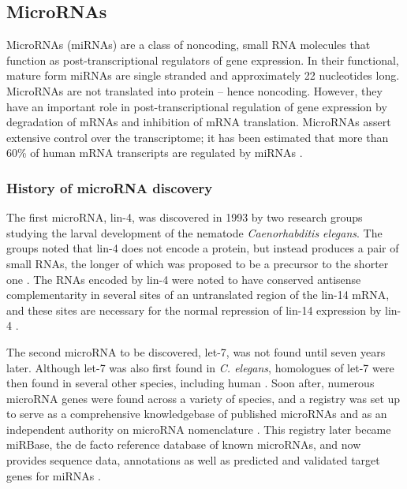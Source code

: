 \subsection{MicroRNAs}\label{micrornas}

MicroRNAs (miRNAs) are a class of noncoding, small RNA molecules that function
as post-transcriptional regulators of gene expression. In their functional,
mature form miRNAs are single stranded and approximately 22 nucleotides
long. MicroRNAs are not translated into protein -- hence noncoding. However,
they have an important role in post-transcriptional regulation of gene
expression by degradation of mRNAs and inhibition of mRNA translation. MicroRNAs
assert extensive control over the transcriptome; it has been estimated that
more than 60\% of human mRNA transcripts are regulated by miRNAs \citep{CITE}.



\subsubsection{History of microRNA discovery}

The first microRNA, lin-4, was discovered in 1993 by two research groups
studying the larval development of the nematode \emph{Caenorhabditis elegans}.
The groups noted that lin-4 does not encode a protein, but instead produces a
pair of small RNAs, the longer of which was proposed to be a precursor to the
shorter one \citep{Lee1993}. The RNAs encoded by lin-4 were noted to have conserved
antisense complementarity in several sites of an untranslated region of the
lin-14 mRNA, and these sites are necessary for the normal repression of lin-14
expression by lin-4 \citep{Lee1993,Wightman1993}.

The second microRNA to be discovered, let-7, was not found until seven years
later. Although let-7 was also first found in \emph{C. elegans}, homologues of
let-7 were then found in several other species, including human
\citep{Pasquinelli2000}. Soon after, numerous microRNA genes were found across
a variety of species, and a registry was set up to serve as a comprehensive
knowledgebase of published microRNAs and as an independent authority on
microRNA nomenclature \citep{Griffiths2004}. This registry later became
miRBase, the de facto reference database of known microRNAs, and now provides
sequence data, annotations as well as predicted and validated target genes for
miRNAs \citep{Kozomara2014}.

